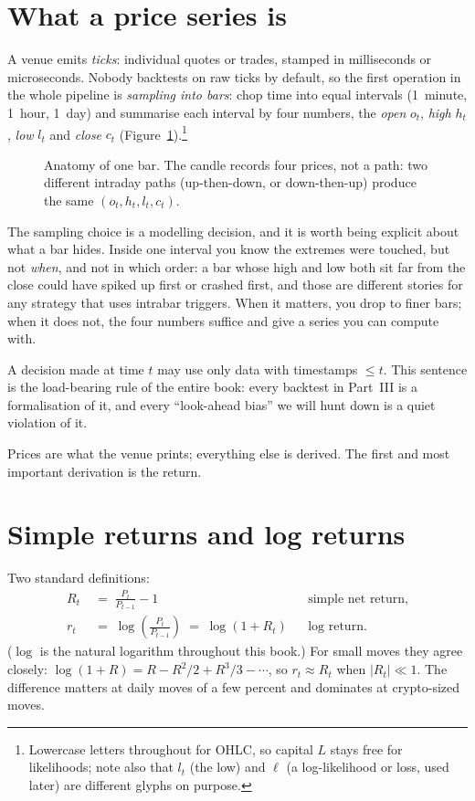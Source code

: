 \section{What a price series is}\label{sec:prices}
A venue emits \emph{ticks}: individual quotes or trades, stamped in
milliseconds or microseconds. Nobody backtests on raw ticks by
default, so the first operation in the whole pipeline is
\emph{sampling into bars}: chop time into equal intervals (1~minute,
1~hour, 1~day) and summarise each interval by four numbers, the
\emph{open} $o_t$, \emph{high} $h_t$, \emph{low} $l_t$ and
\emph{close} $c_t$ (Figure~\ref{fig:candle}).\footnote{Lowercase
letters throughout for OHLC, so capital $L$ stays free for
likelihoods; note also that $l_t$ (the low) and $\ell$ (a
log-likelihood or loss, used later) are different glyphs on purpose.}

\begin{figure}[ht]\centering

\caption{Anatomy of one bar. The candle records four prices, not a
path: two different intraday paths (up-then-down, or down-then-up)
produce the same $(o_t,h_t,l_t,c_t)$.}
\label{fig:candle}
\end{figure}

The sampling choice is a modelling decision, and it is worth being
explicit about what a bar hides. Inside one interval you know the
extremes were touched, but not \emph{when}, and not in which order: a
bar whose high and low both sit far from the close could have spiked
up first or crashed first, and those are different stories for any
strategy that uses intrabar triggers. When it matters, you drop to
finer bars; when it does not, the four numbers suffice and give a
series you can compute with.

\begin{principle}
A decision made at time $t$ may use only data with timestamps
$\le t$. This sentence is the load-bearing rule of the entire book:
every backtest in Part~III is a formalisation of it, and every
``look-ahead bias'' we will hunt down is a quiet violation of it.
\end{principle}

Prices are what the venue prints; everything else is derived. The
first and most important derivation is the return.

\section{Simple returns and log returns}\label{sec:returns}
Two standard definitions:
\begin{align}
R_t &\;=\; \frac{P_t}{P_{t-1}} - 1
&&\text{simple net return,} \label{eq:simple}\\
r_t &\;=\; \log\!\left(\frac{P_t}{P_{t-1}}\right) \;=\; \log(1+R_t)
&&\text{log return.} \label{eq:logret}
\end{align}
($\log$ is the natural logarithm throughout this book.) For small
moves they agree closely: $\log(1+R) = R - R^2/2 + R^3/3 - \cdots$, so
$r_t \approx R_t$ when $|R_t|\ll 1$. The difference matters at daily
moves of a few percent and dominates at crypto-sized moves.

